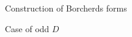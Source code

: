 \documentclass{amsart}
\newcounter{lemma}
\theoremstyle{definition}
\def\Z{\mathbb Z}
\def\mod{\  \mathrm{mod}\ }
\def\CM{\mathrm{CM}}
\begin{document}
\begin{section}{Construction of Borcherds forms}
\begin{subsection}{Case of odd $D$}

\end{subsection}
\end{section}
\end{document}
